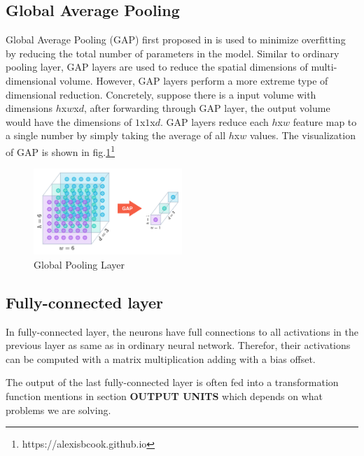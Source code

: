\subsection{Global Average Pooling}
\hspace{0.5cm}Global Average Pooling (GAP) first proposed in \cite{netinnet} is used to minimize overfitting by reducing the total number of parameters in the model. Similar to ordinary pooling layer, GAP layers are used to reduce the spatial dimensions of multi-dimensional volume. However, GAP layers perform a more extreme type of dimensional reduction. Concretely, suppose there is a input volume with dimensions $h$x$w$x$d$, after forwarding through GAP layer, the output volume would have the dimensions of $1$x$1$x$d$. GAP layers reduce each $h$x$w$ feature map to a single number by simply taking the average of all $h$x$w$ values. The visualization of GAP is shown in fig.\ref{fig:gap}\footnote{https://alexisbcook.github.io}
\begin{figure}[h!]
    \centering
    \includegraphics[width=0.5\textwidth]{Chapters/Fig/gap.png}
    \caption{Global Pooling Layer}
    \label{fig:gap}
\end{figure}
\subsection{Fully-connected layer}
\hspace{0.5cm} In fully-connected layer, the neurons have full connections to all activations in the previous layer as same as in ordinary neural network. Therefor, their activations can be computed with a matrix multiplication adding with a bias offset.\par
The output of the last fully-connected layer is often fed into a transformation function mentions in section \textbf{OUTPUT UNITS} which depends on what problems we are solving.
